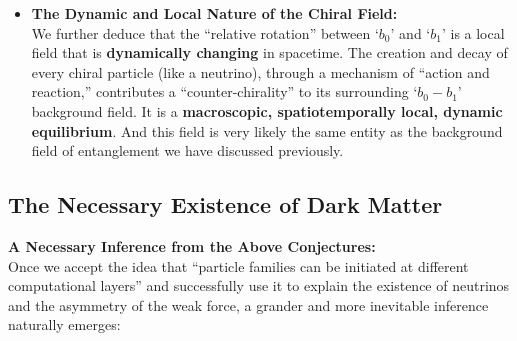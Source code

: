 \documentclass[11pt, a4paper]{article}
\begin{document}
\begin{itemize}
\begin{enumerate}
        \item \textbf{Neutrinos (`$b_1$' Family)—A Chiral-Asymmetric ``Pure State'':}\\
        The neutrino, as an entity purely \textbf{initiated at the `$b_1$' layer}, \textbf{does not have the option of a state that is ``closer to `$b_0$'''}. From the perspective of particles in the `$b_0$' family, its only stable dynamical mode is one that remains perfectly \textbf{synchronized} with the ``relative rotation'' characteristic of the `$b_1$' frame in which it resides. Therefore, from our `$b_0$' observer's perspective, \textbf{the neutrino is always bound to the `$b_1$' frame with that ``relative rotation,''} and thus exhibits only one chirality (namely, what we define as ``left-handed'').
    \end{enumerate}

    \item \textbf{The Dynamic and Local Nature of the Chiral Field:}\\
    We further deduce that the ``relative rotation'' between `$b_0$' and `$b_1$' is a local field that is \textbf{dynamically changing} in spacetime. The creation and decay of every chiral particle (like a neutrino), through a mechanism of ``action and reaction,'' contributes a ``counter-chirality'' to its surrounding `$b_0-b_1$' background field. It is a \textbf{macroscopic, spatiotemporally local, dynamic equilibrium}. And this field is very likely the same entity as the background field of entanglement we have discussed previously.
\end{itemize}

\subsection{The Necessary Existence of Dark Matter}
\noindent\textbf{A Necessary Inference from the Above Conjectures:}\\
Once we accept the idea that ``particle families can be initiated at different computational layers'' and successfully use it to explain the existence of neutrinos and the asymmetry of the weak force, a grander and more inevitable inference naturally emerges:
\end{document}
